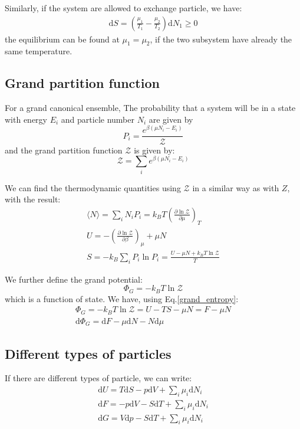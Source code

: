 \documentclass{article}
\newcommand{\pfrac}[2]{\frac{\partial #1}{\partial #2}}
\newcommand{\dnor}{\text{d}}
\begin{document}
Similarly, if the system are allowed to exchange particle, we have:
\begin{align}
    \dnor S = \left( \frac{\mu_1}{T_1} - \frac{\mu_2}{T_2} \right) \dnor N_1 \ge 0
\end{align}
the equilibrium can be found at $\mu_1 = \mu_2$, if the two subsystem have 
already the same temperature.

\subsection{Grand partition function}
For a grand canonical ensemble, The probability that a system
will be in a state with energy $E_i$ and particle number $N_i$ are 
given by
\begin{equation}
    P_i = \frac{e^{\beta(\mu N_i - E_i)}}{\mathcal{Z}}
\end{equation}
and the grand partition function $\mathcal{Z}$ is given by:
\begin{equation}
    \mathcal{Z} = \sum_i e^{\beta(\mu N_i - E_i)}
\end{equation}

We can find the thermodynamic quantities using $\mathcal{Z}$ in 
a similar way as with $Z$, with the result:
\begin{gather}
   \langle N \rangle = \sum_i N_i P_i = k_B T \left( \pfrac{\ln \mathcal{Z}}{\mu} \right)_T \\
    U = - \left( \pfrac{\ln \mathcal{Z}}{\beta} \right)_{\mu} + \mu N \\
    S = -k_B \sum_i P_i \ln P_i = \frac{U - \mu N + k_B T\ln \mathcal{Z}}{T} \label{grand_entropy}
\end{gather}

We further define the grand potential:
\begin{equation}
    \Phi_G = -k_B T \ln \mathcal{Z}
\end{equation}
which is a function of state. We have, using Eq.\ref{grand_entropy}:
\begin{gather}
    \Phi_G = -k_B T \ln \mathcal{Z} = U - TS - \mu N = F - \mu N \\
    \dnor \Phi_G = \dnor F - \mu \dnor N - N \dnor \mu
\end{gather}

\subsection{Different types of particles}
If there are different types of particle, we can write:
\begin{gather}
    \dnor U = T \dnor S - p \dnor V + \sum_i \mu_i \dnor N_i \\
    \dnor F = -p \dnor V - S \dnor T + \sum_i \mu_i \dnor N_i \\
    \dnor G = V \dnor p - S \dnor T + \sum_i \mu_i \dnor N_i 
\end{gather}
\end{document}
